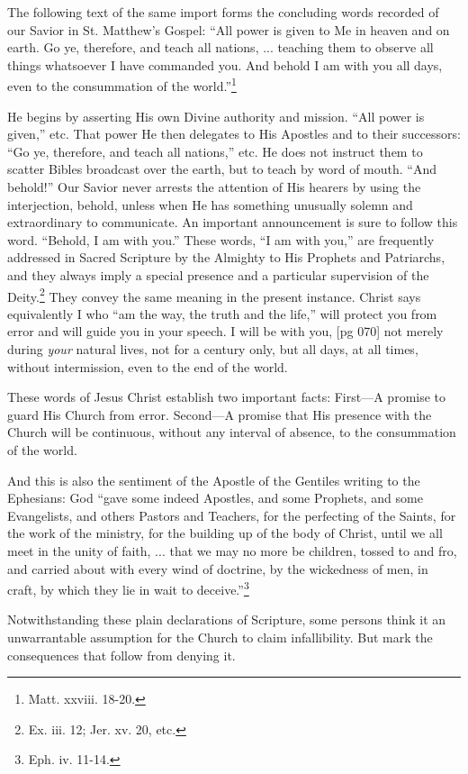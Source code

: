 The following text of the same import forms the
concluding words recorded of our Savior in St.
Matthew's Gospel: “All power is given to Me in
heaven and on earth. Go ye, therefore, and teach
all nations, ... teaching them to observe all
things whatsoever I have commanded you. And
behold I am with you all days, even to the consummation
of the world.”\footnote{Matt. xxviii. 18-20.}

He begins by asserting His own Divine authority
and mission. “All power is given,” etc. That
power He then delegates to His Apostles and to
their successors: “Go ye, therefore, and teach all
nations,” etc. He does not instruct them to scatter
Bibles broadcast over the earth, but to teach
by word of mouth. “And behold!” Our Savior
never arrests the attention of His hearers by
using the interjection, behold, unless when He has
something unusually solemn and extraordinary
to communicate. An important announcement is
sure to follow this word. “Behold, I am with
you.” These words, “I am with you,” are frequently
addressed in Sacred Scripture by the Almighty
to His Prophets and Patriarchs, and they
always imply a special presence and a particular
supervision of the Deity.\footnote{Ex. iii.
12; Jer. xv. 20, etc.} They convey the same
meaning in the present instance. Christ says
equivalently I who “am the way, the truth and
the life,” will protect you from error and will
guide you in your speech. I will be with you,
[pg 070]
not merely during \emph{your} natural lives, not for a
century only, but all days, at all times, without
intermission, even to the end of the world.

These words of Jesus Christ establish two important
facts: First—A promise to guard His
Church from error. Second—A promise that His
presence with the Church will be continuous, without
any interval of absence, to the consummation
of the world.

And this is also the sentiment of the Apostle of
the Gentiles writing to the Ephesians: God “gave
some indeed Apostles, and some Prophets, and
some Evangelists, and others Pastors and Teachers,
for the perfecting of the Saints, for the work
of the ministry, for the building up of the body
of Christ, until we all meet in the unity of faith, ...
that we may no more be children, tossed to
and fro, and carried about with every wind of
doctrine, by the wickedness of men, in craft, by
which they lie in wait to deceive.”\footnote{Eph. iv. 11-14.}

Notwithstanding these plain declarations of
Scripture, some persons think it an unwarrantable
assumption for the Church to claim infallibility.
But mark the consequences that follow
from denying it.

